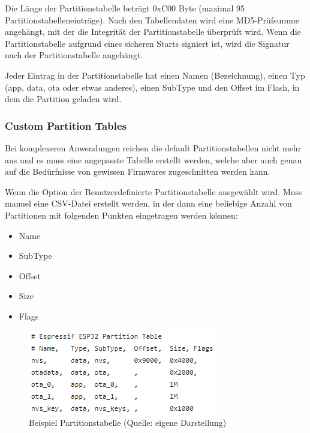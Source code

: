 Die Länge der Partitionstabelle beträgt 0xC00 Byte (maximal 95 Partitionstabelleneinträge). Nach den Tabellendaten wird eine MD5-Prüfsumme angehängt, mit der die Integrität der Partitionstabelle überprüft wird. Wenn die Partitionstabelle aufgrund eines sicheren Starts signiert ist, wird die Signatur nach der Partitionstabelle angehängt.

Jeder Eintrag in der Partitionstabelle hat einen Namen (Bezeichnung), einen Typ (app, data, ota oder etwas anderes), einen SubType und den Offset im Flash, in dem die Partition geladen wird.

\subsubsection{Custom Partition Tables}
Bei komplexeren Anwendungen reichen die default Partitionstabellen nicht mehr aus und es muss eine angepasste Tabelle erstellt werden, welche aber auch genau auf die Bedürfnisse von gewissen Firmwares zugeschnitten werden kann.

Wenn die Option der Benutzerdefinierte Partitionstabelle ausgewählt wird. Muss manuel eine CSV-Datei erstellt werden, in der dann eine beliebige Anzahl von Partitionen mit folgenden Punkten eingetragen werden können:

\begin{itemize}
    \item Name
    \item SubType
    \item Offset
    \item Size
    \item Flags
\end{itemize}

\begin{figure}[H]
    \begin{center}
        \includegraphics[scale=1]{images/partition_table.png}
        \caption{Beispiel Partitionstabelle (Quelle: eigene Darstellung)}
    \end{center}    
\end{figure}


